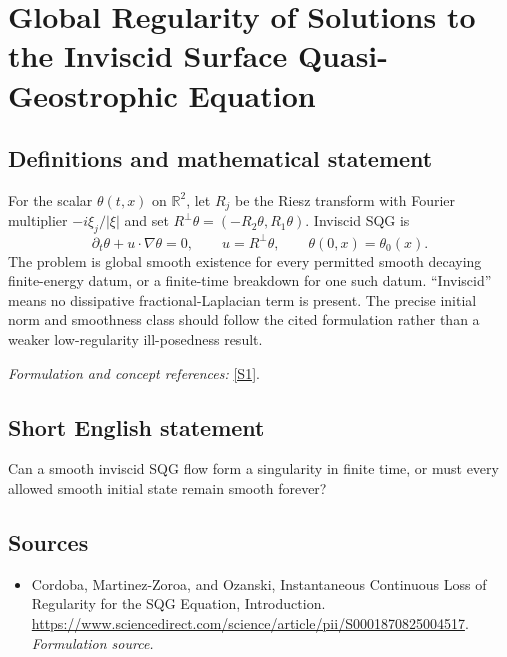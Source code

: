 \documentclass[11pt]{article}
\begin{document}
\section*{\texorpdfstring{Global Regularity of Solutions to the Inviscid Surface Quasi-Geostrophic Equation}{Global Regularity of Solutions to the Inviscid Surface Quasi-Geostrophic Equation}}\label{30006753}
\subsection{Definitions and mathematical statement}
For the scalar $\theta(t,x)$ on ${\mathbb{R}}^2$, let $R_j$ be the Riesz transform with Fourier multiplier $-i\xi_j/|\xi|$ and set $R^\perp\theta=(-R_2\theta,R_1\theta)$. Inviscid SQG is
\[
 \partial_t\theta+u\cdot\nabla\theta=0,\qquad u=R^\perp\theta,
 \qquad\theta(0,x)=\theta_0(x).
\]
The problem is global smooth existence for every permitted smooth decaying finite-energy datum, or a finite-time breakdown for one such datum. ``Inviscid'' means no dissipative fractional-Laplacian term is present. The precise initial norm and smoothness class should follow the cited formulation rather than a weaker low-regularity ill-posedness result.
\par\smallskip\textit{Formulation and concept references:} \href{https://www.sciencedirect.com/science/article/pii/S0001870825004517}{[S1]}.

\subsection{Short English statement}
Can a smooth inviscid SQG flow form a singularity in finite time, or must every allowed smooth initial state remain smooth forever?
\subsection{Sources}
\begin{itemize}
\item[S1]Cordoba, Martinez-Zoroa, and Ozanski, Instantaneous Continuous Loss of Regularity for the SQG Equation, Introduction.
\url{https://www.sciencedirect.com/science/article/pii/S0001870825004517}.
\textit{Formulation source.}
\end{itemize}
\end{document}
